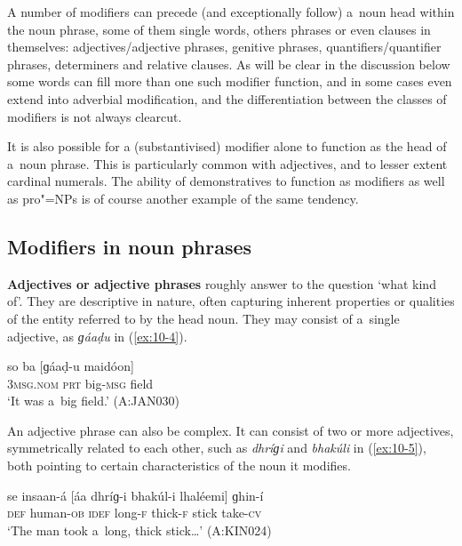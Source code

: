A number of modifiers can precede (and exceptionally follow) a~noun head within the noun phrase, some of them single words, others phrases or even clauses in themselves: adjectives/adjective phrases, genitive phrases, quantifiers/quantifier phrases, determiners and relative clauses. As will be clear in the discussion below some words can fill more than one such modifier function, and in some cases even extend into adverbial modification, and the differentiation between the classes of modifiers is not always clearcut.


It is also possible for a (substantivised) modifier alone to function as the head of a~noun phrase. This is particularly common with adjectives, and to lesser extent cardinal numerals. The ability of demonstratives to function as modifiers as well as pro"=NPs is of course another example of the same tendency.


\subsection{Modifiers in noun phrases}
\label{subsec:10-1-2}


\textbf{Adjectives or adjective phrases} roughly answer to the question `what kind of'. They are descriptive in nature, often capturing inherent properties or qualities of the entity referred to by the head noun. They may consist of a~single adjective, as \textit{ɡáaḍu} in (\ref{ex:10-4}).

\begin{exe}
\ex
\label{ex:10-4}
\gll so ba [ɡáaḍ-u maidóon] \\
\textsc{3msg.nom} \textsc{prt} big-\textsc{msg} field \\
\glt `It was a~big field.' (A:JAN030)
\end{exe}

An adjective phrase can also be complex. It can consist of two or more adjectives, symmetrically related to each other, such as \textit{dhríɡi} and \textit{bhakúli} in (\ref{ex:10-5}), both pointing to certain characteristics of the noun it modifies. 

\begin{exe}
\ex
\label{ex:10-5}
\gll se insaan-á [áa dhríɡ-i bhakúl-i lhaléemi] ɡhin-í \\
\textsc{def} human-\textsc{ob} \textsc{idef} long-\textsc{f} thick-\textsc{f} stick  take-\textsc{cv} \\
\glt `The man took a~long, thick stick{\ldots}' (A:KIN024)
\end{exe}

